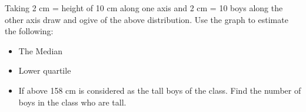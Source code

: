 \begin{enumerate}[label=(\roman*)]
        Taking 2 cm = height of 10 cm along one axis and 2 cm = 10 boys
        along the other axis draw and ogive of the above distribution. 
        Use the graph to estimate the following:

        \begin{itemize}
            \item The Median
            \item Lower quartile
            \item If above 158 cm is considered as the tall boys of the 
                  class. Find the number of boys in the class who are tall.
        \end{itemize}

\end{enumerate}


